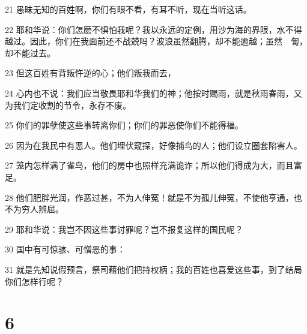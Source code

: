 \par 21 愚昧无知的百姓啊，你们有眼不看，有耳不听，现在当听这话。
\par 22 耶和华说：你们怎麽不惧怕我呢？我以永远的定例，用沙为海的界限，水不得越过。因此，你们在我面前还不战兢吗？波浪虽然翻腾，却不能逾越；虽然　訇，却不能过去。
\par 23 但这百姓有背叛忤逆的心；他们叛我而去，
\par 24 心内也不说：我们应当敬畏耶和华我们的神；他按时赐雨，就是秋雨春雨，又为我们定收割的节令，永存不废。
\par 25 你们的罪孽使这些事转离你们；你们的罪恶使你们不能得福。
\par 26 因为在我民中有恶人。他们埋伏窥探，好像捕鸟的人；他们设立圈套陷害人。
\par 27 笼内怎样满了雀鸟，他们的房中也照样充满诡诈；所以他们得成为大，而且富足。
\par 28 他们肥胖光润，作恶过甚，不为人伸冤！就是不为孤儿伸冤，不使他亨通，也不为穷人辨屈。
\par 29 耶和华说：我岂不因这些事讨罪呢？岂不报复这样的国民呢？
\par 30 国中有可惊骇、可憎恶的事：
\par 31 就是先知说假预言，祭司藉他们把持权柄；我的百姓也喜爱这些事，到了结局你们怎样行呢？

\chapter{6}

